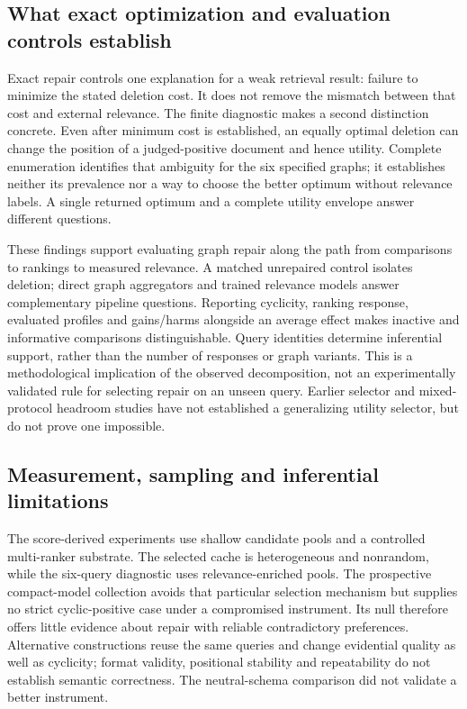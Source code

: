 \documentclass[pdflatex,iicol,sn-basic,Numbered]{sn-jnl}
\begin{document}
\subsection{What exact optimization and evaluation controls establish}
Exact repair controls one explanation for a weak retrieval result: failure to minimize the stated deletion cost. It does not remove the mismatch between that cost and external relevance. The finite diagnostic makes a second distinction concrete. Even after minimum cost is established, an equally optimal deletion can change the position of a judged-positive document and hence utility. Complete enumeration identifies that ambiguity for the six specified graphs; it establishes neither its prevalence nor a way to choose the better optimum without relevance labels. A single returned optimum and a complete utility envelope answer different questions.

These findings support evaluating graph repair along the path from comparisons to rankings to measured relevance. A matched unrepaired control isolates deletion; direct graph aggregators and trained relevance models answer complementary pipeline questions. Reporting cyclicity, ranking response, evaluated profiles and gains/harms alongside an average effect makes inactive and informative comparisons distinguishable. Query identities determine inferential support, rather than the number of responses or graph variants. This is a methodological implication of the observed decomposition, not an experimentally validated rule for selecting repair on an unseen query. Earlier selector and mixed-protocol headroom studies have not established a generalizing utility selector, but do not prove one impossible.

\subsection{Measurement, sampling and inferential limitations}
The score-derived experiments use shallow candidate pools and a controlled multi-ranker substrate. The selected cache is heterogeneous and nonrandom, while the six-query diagnostic uses relevance-enriched pools. The prospective compact-model collection avoids that particular selection mechanism but supplies no strict cyclic-positive case under a compromised instrument. Its null therefore offers little evidence about repair with reliable contradictory preferences. Alternative constructions reuse the same queries and change evidential quality as well as cyclicity; format validity, positional stability and repeatability do not establish semantic correctness. The neutral-schema comparison did not validate a better instrument.
\end{document}
